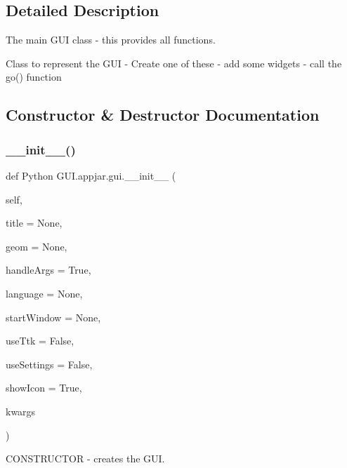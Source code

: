 \subsection{Detailed Description}
The main G\+UI class -\/ this provides all functions. 

\begin{DoxyVerb}Class to represent the GUI
    - Create one of these
    - add some widgets
    - call the go() function \end{DoxyVerb}
 

\subsection{Constructor \& Destructor Documentation}
\mbox{\label{class_python_01_g_u_i_1_1appjar_1_1gui_a72e750fb68d42cb68b0fe7779328b062}} 
\subsubsection{\texorpdfstring{\+\_\+\+\_\+init\+\_\+\+\_\+()}{\_\_init\_\_()}}
{\footnotesize\ttfamily def Python G\+U\+I.\+appjar.\+gui.\+\_\+\+\_\+init\+\_\+\+\_\+ (\begin{DoxyParamCaption}\item[{}]{self,  }\item[{}]{title = {\ttfamily None},  }\item[{}]{geom = {\ttfamily None},  }\item[{}]{handle\+Args = {\ttfamily True},  }\item[{}]{language = {\ttfamily None},  }\item[{}]{start\+Window = {\ttfamily None},  }\item[{}]{use\+Ttk = {\ttfamily False},  }\item[{}]{use\+Settings = {\ttfamily False},  }\item[{}]{show\+Icon = {\ttfamily True},  }\item[{}]{kwargs }\end{DoxyParamCaption})}



C\+O\+N\+S\+T\+R\+U\+C\+T\+OR -\/ creates the G\+UI. 

